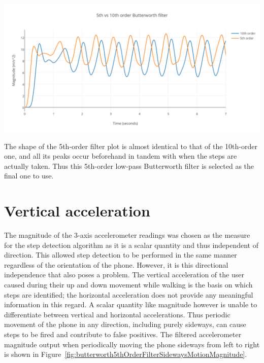 \documentclass[12pt,a4paper,notitlepage]{report}
\begin{document}
\begin{center}
\includegraphics[scale=0.9]{images/butterworth5thVs10thOrderWalkingMagnitude.png}
\label{fig:butterworth5thVs10thOrderWalkingMagnitude}
\end{center}

The shape of the 5th-order filter plot is almost identical to that of the 10th-order one, and all its peaks occur beforehand in tandem with when the steps are actually taken. Thus this 5th-order low-pass Butterworth filter is selected as the final one to use. 

\section*{Vertical acceleration}

The magnitude of the 3-axis accelerometer readings was chosen as the measure for the step detection algorithm as it is a scalar quantity and thus independent of direction. This allowed step detection to be performed in the same manner regardless of the orientation of the phone. However, it is this directional independence that also poses a problem. The vertical acceleration of the user caused during their up and down movement while walking is the basis on which steps are identified; the horizontal acceleration does not provide any meaningful information in this regard. A scalar quantity like magnitude however is unable to differentiate between vertical and horizontal accelerations. Thus periodic movement of the phone in any direction, including purely sideways, can cause steps to be fired and contribute to false positives. The filtered accelerometer magnitude output when periodically moving the phone sideways from left to right is shown in Figure~\ref{fig:butterworth5thOrderFilterSidewaysMotionMagnitude}. 
\end{document}
